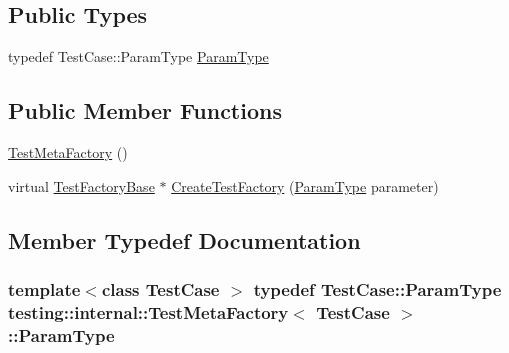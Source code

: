 \subsection*{Public Types}
\begin{DoxyCompactItemize}
\item 
typedef Test\-Case\-::\-Param\-Type \hyperlink{classtesting_1_1internal_1_1TestMetaFactory_a9c12e442b4389381b948ed669fcf0f84}{Param\-Type}
\end{DoxyCompactItemize}
\subsection*{Public Member Functions}
\begin{DoxyCompactItemize}
\item 
\hyperlink{classtesting_1_1internal_1_1TestMetaFactory_a3eadbf9867b702bcba130a3113a77b71}{Test\-Meta\-Factory} ()
\item 
virtual \hyperlink{classtesting_1_1internal_1_1TestFactoryBase}{Test\-Factory\-Base} $\ast$ \hyperlink{classtesting_1_1internal_1_1TestMetaFactory_ae9f5334c68af309bca8f7ec29d837e38}{Create\-Test\-Factory} (\hyperlink{classtesting_1_1internal_1_1TestMetaFactory_a9c12e442b4389381b948ed669fcf0f84}{Param\-Type} parameter)
\end{DoxyCompactItemize}


\subsection{Member Typedef Documentation}
\hypertarget{classtesting_1_1internal_1_1TestMetaFactory_a9c12e442b4389381b948ed669fcf0f84}{
\subsubsection[{Param\-Type}]{\setlength{\rightskip}{0pt plus 5cm}template$<$class Test\-Case $>$ typedef Test\-Case\-::\-Param\-Type {\bf testing\-::internal\-::\-Test\-Meta\-Factory}$<$ {\bf Test\-Case} $>$\-::{\bf Param\-Type}}}\label{classtesting_1_1internal_1_1TestMetaFactory_a9c12e442b4389381b948ed669fcf0f84}


